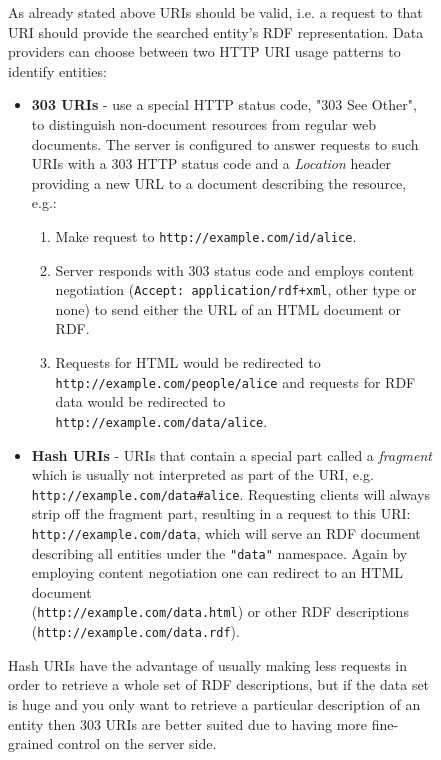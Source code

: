 \begin{figure}[h!]
As already stated above URIs should be valid, i.e. a request to that URI should provide the searched entity's RDF representation. Data providers can choose between two HTTP URI usage patterns to identify entities:
\begin{itemize}
    \item \textbf{303 URIs} - use a special HTTP status code, "303 See Other", to distinguish non-document resources from regular web documents. The server is configured to answer requests to such URIs with a 303 HTTP status code and a \textit{Location} header providing a new URL to a document describing the resource, e.g.:
    \begin{enumerate}
        \item Make request to \verb|http://example.com/id/alice|.
        \item Server responds with 303 status code and employs content negotiation (\verb|Accept: application/rdf+xml|, other type or none) to send either the URL of an HTML document or RDF.
        \item Requests for HTML would be redirected to \\ \verb|http://example.com/people/alice| and requests for RDF data would be redirected to \verb|http://example.com/data/alice|.
    \end{enumerate}
    \item \textbf{Hash URIs} - URIs that contain a special part called a \textit{fragment} which is usually not interpreted as part of the URI, e.g. \verb|http://example.com/data#alice|. Requesting clients will always strip off the fragment part, resulting in a request to this URI: \verb|http://example.com/data|, which will serve an RDF document describing all entities under the \verb|"data"| namespace. Again by employing content negotiation one can redirect to an HTML document \\ (\verb|http://example.com/data.html|) or other RDF descriptions \\ (\verb|http://example.com/data.rdf|).
\end{itemize}
Hash URIs have the advantage of usually making less requests in order to retrieve a whole set of RDF descriptions, but if the data set is huge and you only want to retrieve a particular description of an entity then 303 URIs are better suited due to having more fine-grained control on the server side.


\end{figure}
